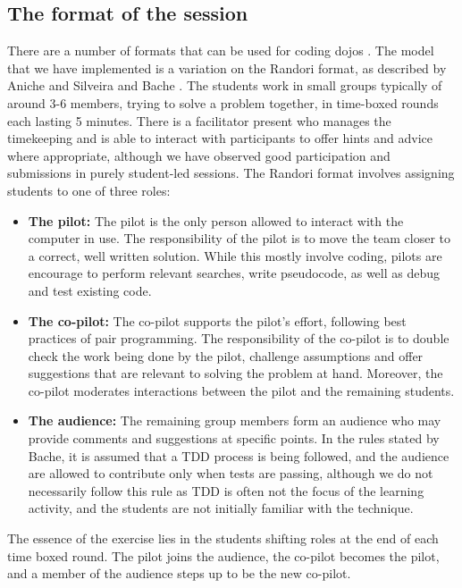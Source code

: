 \subsection{The format of the session}
There are a number of formats that can be used for coding dojos \cite{rooksby2014theory}. The model that we have implemented is a variation on the Randori format, as described by Aniche and Silveira \cite{aniche2011increasing} and Bache \cite{bache2013coding}. The students work in small groups typically of around 3-6 members, trying to solve a problem together, in time-boxed rounds each lasting 5 minutes. There is a facilitator present who manages the timekeeping and is able to interact with participants to offer hints and advice where appropriate, although we have observed good participation and submissions in purely student-led sessions. The Randori format involves assigning students to one of three roles: 
\begin{itemize}
\item \textbf{The pilot:} The pilot is the only person allowed to interact with the computer in use. The responsibility of the pilot is to move the team closer to a correct, well written solution. While this mostly involve coding, pilots are encourage to perform relevant searches, write pseudocode, as well as debug and test existing code.
\item \textbf{The co-pilot:} The co-pilot supports the pilot's effort, following best practices of pair programming. The responsibility of the co-pilot is to double check the work being done by the pilot, challenge assumptions and offer suggestions that are relevant to solving the problem at hand. Moreover, the co-pilot moderates interactions between the pilot and the remaining students.
\item \textbf{The audience:} The remaining group members form an audience who may provide comments and suggestions at specific points. In the rules stated by Bache, it is assumed that a TDD process is being followed, and the audience are allowed to contribute only when tests are passing, although we do not necessarily follow this rule as TDD is often not the focus of the learning activity, and the students are not initially familiar with the technique. 
\end{itemize}
The essence of the exercise lies in the students shifting roles at the end of each time boxed round. The pilot joins the audience, the co-pilot becomes the pilot, and a member of the audience steps up to be the new co-pilot. 

